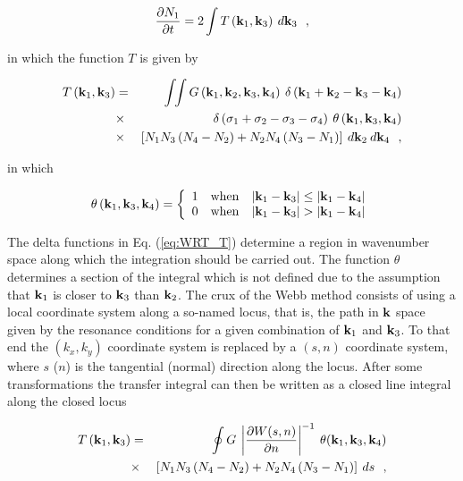 \begin{equation}
{{\partial N_1 } \over {\partial t}} = 2\int T\left( {\mbox{\bf k}_1 ,\mbox{\bf k}_3 }
\right) \: d\mbox{\bf k}_3  \:\:\: ,
\end{equation}

\noindent
in which the function $T$ is given by

\begin{eqnarray}
T \left( \mbox{\bf k}_1 ,\mbox{\bf k}_3 \right) & = & \int\!\!\int
G\left( \mbox{\bf k}_1 ,\mbox{\bf k}_2, \mbox{\bf k}_3 ,\mbox{\bf k}_4 \right) \: \delta \left( \mbox{\bf k}_1  +
\mbox{\bf k}_2  - \mbox{\bf k}_3  - \mbox{\bf k}_4 \right) \nonumber \\
& \times & \delta \left( {\sigma _1  + \sigma _2  - \sigma _3  -
\sigma _4 }
\right) \: \theta \left ( \mbox{\bf k}_1 , \mbox{\bf k}_3 , \mbox{\bf k}_4 \right )
\nonumber \\
& \times & \left [ N_1 N_3 \left ( N_4 - N_2 \right ) + N_2 N_4 \left
(
N_3  - N_1 \right ) \right ] \: d\mbox{\bf k}_2 \: d\mbox{\bf k}_4 \:\:\: ,
\label{eq:WRT_T}
\end{eqnarray}

\noindent
in which

\begin{equation}
\theta \left( {\bk_1 ,\bk_3 ,\bk_4 } \right) = \left\{ {\begin{array}{*{20}c}
   1 & {\rm{when}} & {\left| {\bk_1  - \bk_3 } \right| \leq \left| {\bk_1  - \bk_4 } \right|}  \\
   0 & {\rm{when}} & {\left| {\bk_1  - \bk_3 } \right| > \left| {\bk_1  - \bk_4 } \right|}  \\
 \end{array} } \right.
\end{equation}

The delta functions in Eq. (\ref{eq:WRT_T}) determine a region in wavenumber
space along which the integration should be carried out.  The function
$\theta$ determines a section of the integral which is not defined due to the
assumption that $\mbox{\bf k}_1$ is closer to $\mbox{\bf k}_3$ than $\mbox{\bf k}_2$. The crux of the
Webb method consists of using a local coordinate system along a so-named
locus, that is, the path in $\mbox{\bf k}$ space given by the resonance conditions for
a given combination of $\mbox{\bf k}_1$ and $\mbox{\bf k}_3$. To that end the $(k_{x},k_{y})$
coordinate system is replaced by a $(s,n)$ coordinate system, where $s$ ($n$)
is the tangential (normal) direction along the locus. After some
transformations the transfer integral can then be written as a closed line
integral along the closed locus

\begin{eqnarray}
T \left( \mbox{\bf k}_1 ,\mbox{\bf k}_3 \right) & = & \oint G \:
\left | \frac{\partial W(s,n)}{\partial n}\right | ^{-1}
\: \theta ( \mbox{\bf k}_1 , \mbox{\bf k}_3 , \mbox{\bf k}_4 ) \nonumber \\
& \times & \left [ N_1 N_3 \left ( N_4 - N_2 \right ) + N_2 N_4 \left
(
N_3  - N_1 \right ) \right ] \: d s  \:\:\: , \label{eq:WRT_T2}
\end{eqnarray}

